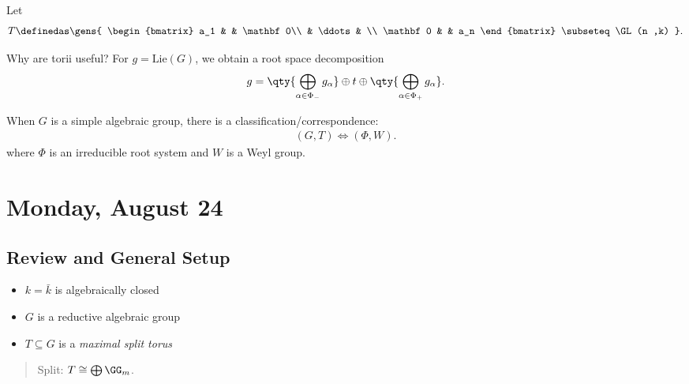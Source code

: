 \begin{example}

Let
\begin{align*}  
T \definedas 
\gens{
\begin{bmatrix}
a_1 &  & \mathbf 0\\
 & \ddots &  \\
\mathbf 0 &  & a_n
\end{bmatrix} \subseteq \GL(n ,k)
}
.\end{align*}

\end{example}

\begin{remark}

Why are torii useful? For \(g = \mathrm{Lie}(G)\), we obtain a root
space decomposition
\begin{align*}  
g = 
\qty{\bigoplus_{\alpha \in \Phi_- }g_\alpha} \oplus 
t \oplus
\qty{\bigoplus_{\alpha \in \Phi_+ }g_\alpha} 
.\end{align*}

When \(G\) is a simple algebraic group, there is a
classification/correspondence:
\begin{align*}  
(G, T) \iff (\Phi, W)
.\end{align*} where \(\Phi\) is an irreducible root system and \(W\) is
a Weyl group.

\end{remark}

\hypertarget{monday-august-24}{%
\section{Monday, August 24}\label{monday-august-24}}

\hypertarget{review-and-general-setup}{%
\subsection{Review and General Setup}\label{review-and-general-setup}}

\begin{itemize}
\tightlist
\item
  \(k = \bar k\) is algebraically closed
\item
  \(G\) is a reductive algebraic group
\item
  \(T\subseteq G\) is a \emph{maximal split torus}
\end{itemize}

\begin{quote}
Split: \(T\cong \bigoplus \GG_m\).
\end{quote}

